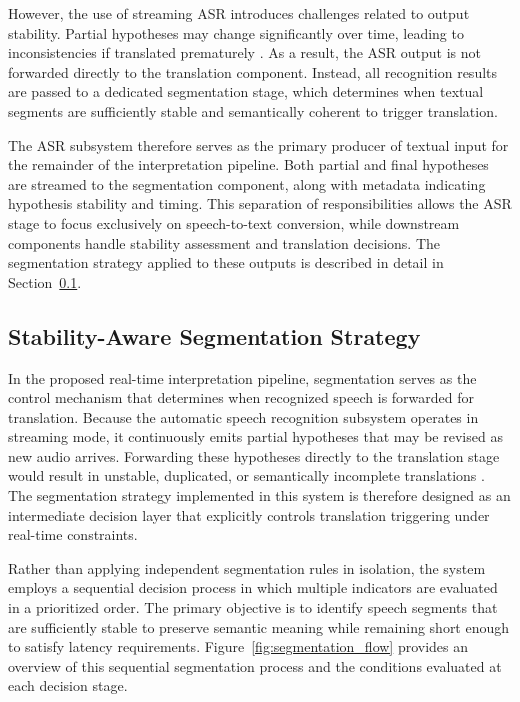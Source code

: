 However, the use of streaming ASR introduces challenges related to output stability. Partial hypotheses may change significantly over time, leading to inconsistencies if translated prematurely \cite{grissom2014realtime}. As a result, the ASR output is not forwarded directly to the translation component. Instead, all recognition results are passed to a dedicated segmentation stage, which determines when textual segments are sufficiently stable and semantically coherent to trigger translation.

The ASR subsystem therefore serves as the primary producer of textual input for the remainder of the interpretation pipeline. Both partial and final hypotheses are streamed to the segmentation component, along with metadata indicating hypothesis stability and timing. This separation of responsibilities allows the ASR stage to focus exclusively on speech-to-text conversion, while downstream components handle stability assessment and translation decisions. The segmentation strategy applied to these outputs is described in detail in Section~\ref{sec:segmentation}.



\subsection{Stability-Aware Segmentation Strategy}
\label{sec:segmentation}

In the proposed real-time interpretation pipeline, segmentation serves as the control mechanism that determines when recognized speech is forwarded for translation. Because the automatic speech recognition subsystem operates in streaming mode, it continuously emits partial hypotheses that may be revised as new audio arrives. Forwarding these hypotheses directly to the translation stage would result in unstable, duplicated, or semantically incomplete translations \cite{cohn2020perceptionTTS}. The segmentation strategy implemented in this system is therefore designed as an intermediate decision layer that explicitly controls translation triggering under real-time constraints.

Rather than applying independent segmentation rules in isolation, the system employs a sequential decision process in which multiple indicators are evaluated in a prioritized order. The primary objective is to identify speech segments that are sufficiently stable to preserve semantic meaning while remaining short enough to satisfy latency requirements. Figure~\ref{fig:segmentation_flow} provides an overview of this sequential segmentation process and the conditions evaluated at each decision stage.

